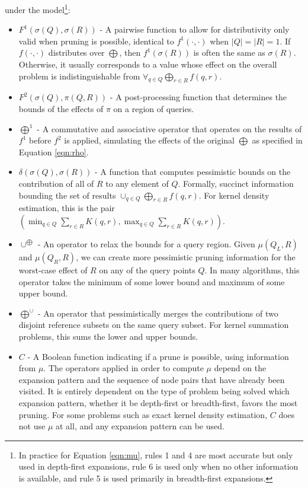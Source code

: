 \documentclass[times, 10pt,twocolumn]{article}
\newcommand{\union}{\cup}
\newcommand{\muv}{\union^{\bigoplus}}
\newcommand{\bigmuh}{\bigoplus^{\union}}
\begin{document}
under the model\footnote{In practice for Equation \ref{eqn:mu}, rules 1 and 4 are most accurate but only used in depth-first expansions, rule 6 is used only when no other information is available, and rule 5 is used primarily in breadth-first expansions.}:
\begin{itemize}
  \item $F^1(\sigma(Q), \sigma(R))$ - A pairwise function to allow for distributivity only valid when pruning is possible, identical to $f^1(\cdot, \cdot)$ when $|Q| = |R| = 1$.
  If $f(\cdot, \cdot)$ distributes over $\bigoplus$, then $f^1(\sigma(R))$ is often the same as $\sigma(R)$.
  Otherwise, it usually corresponds to a value whose effect on the overall problem is indistinguishable from $\forall_{q \in Q} \bigoplus_{r \in R} f(q, r)$.
  \item $F^2(\sigma(Q), \pi(Q, R))$ - A post-processing function that determines the bounds of the effects of $\pi$ on a region of queries.
  \item $\bigoplus^{1}$ - A commutative and associative operator that operates on the results of $f^1$ before $f^2$ is applied, simulating the effects of the original $\bigoplus$ as specified in Equation \ref{eqn:rho}.
  \item $\delta(\sigma(Q), \sigma(R))$ - A function that computes pessimistic bounds on the contribution of all of $R$ to any element of $Q$.
  Formally, succinct information bounding the set of results $\union_{q \in Q} \bigoplus_{r \in R} f(q, r)$.
  For kernel density estimation, this is the pair $(\min_{q \in Q} \sum_{r \in R} K(q, r), \max_{q \in Q} \sum_{r \in R} K(q, r))$.
  \item $\muv$ - An operator to relax the bounds for a query region.
  Given $\mu(Q_L, R)$ and $\mu(Q_R, R)$, we can create more pessimistic pruning information for the worst-case effect of $R$ on any of the query points $Q$.
  In many algorithms, this operator takes the minimum of some lower bound and maximum of some upper bound.
  \item $\bigmuh$ - An operator that pessimistically merges the contributions of two disjoint reference subsets on the same query subset.
  For kernel summation problems, this sums the lower and upper bounds.
  \item $C$ - A Boolean function indicating if a prune is possible, using information from $\mu$.
  The operators applied in order to compute $\mu$ depend on the expansion pattern and the sequence of node pairs that have already been visited.
  It is entirely dependent on the type of problem being solved which expansion pattern, whether it be depth-first or breadth-first, favors the most pruning.
 For some problems such as exact kernel density estimation, $C$ does not use $\mu$ at all, and any expansion pattern can be used.
\end{itemize}
\end{document}
